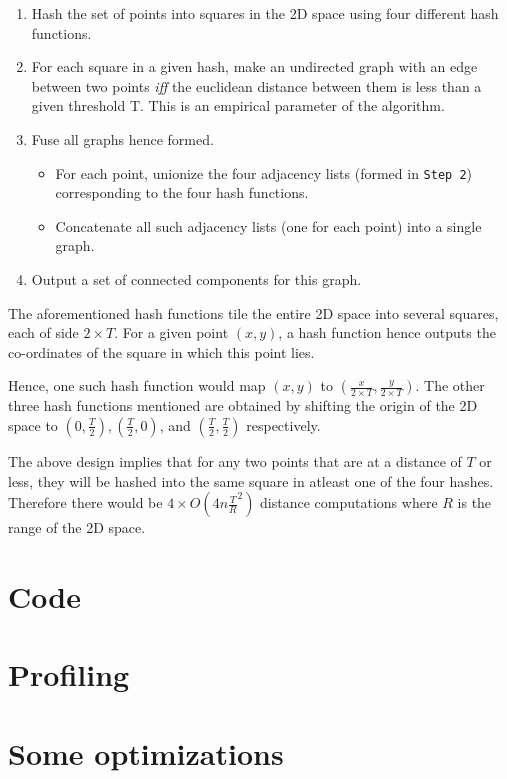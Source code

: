 \begin{enumerate}
\item Hash the set of points into squares in the 2D space using four different hash functions.
\item For each square in a given hash, make an undirected graph with an edge between two points \emph{iff} the euclidean distance between them is less than a given threshold {T}. This is an empirical parameter of the algorithm.
\item Fuse all graphs hence formed.
    \begin{itemize}
        \item For each point, unionize the four adjacency lists (formed in \texttt{Step 2}) corresponding to the four hash functions.
        \item Concatenate all such adjacency lists (one for each point) into a single graph.
    \end{itemize}
\item Output a set of connected components for this graph.
\end{enumerate}
The aforementioned hash functions tile the entire 2D space into several squares, each of side \begin{math}2\times{T}\end{math}. For a given point \begin{math} (x, y) \end{math}, a hash function hence outputs the co-ordinates of the square in which this point lies.

Hence, one such hash function would map \begin{math} (x, y) \end{math} to \begin{math} (\frac{x}{2\times{T}}, \frac{y}{2\times{T}}) \end{math}. The other three hash functions mentioned are obtained by shifting the origin of the 2D space to \begin{math}(0, \frac{T}{2}), (\frac{T}{2}, 0) \end{math}, and \begin{math}(\frac{T}{2}, \frac{T}{2})\end{math} respectively.

    The above design implies that for any two points that are at a distance of \begin{math} T \end{math} or less, they will be hashed into the same square in atleast one of the four hashes. Therefore there would be \begin{math} {4\times{O(4n{\frac{T}{R}}^2)}} \end{math} distance computations where \begin{math} R \end{math} is the range of the 2D space.
\section{Code}
\section{Profiling}
\section{Some optimizations}
